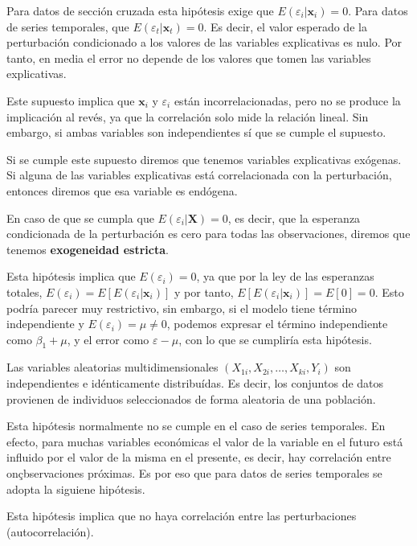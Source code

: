 Para datos de secci\'on cruzada esta hip\'otesis exige que $E(\varepsilon_i|\boldsymbol{x}_i)=0$. Para datos de series temporales, que $E(\varepsilon_t|\boldsymbol{x}_t)=0$. Es decir, el valor esperado de la perturbaci\'on condicionado a los valores de las variables explicativas es nulo. Por tanto, en media el error no depende de los valores que tomen las variables explicativas.

Este supuesto implica que $\boldsymbol{x}_i$ y $\varepsilon_i$ est\'an incorrelacionadas, pero no se produce la implicaci\'on al rev\'es, ya que la correlaci\'on solo mide la relaci\'on lineal. Sin embargo, si ambas variables son independientes s\'i que se cumple el supuesto.

Si se cumple este supuesto diremos que tenemos variables explicativas ex\'ogenas. Si alguna de las variables explicativas est\'a correlacionada con la perturbaci\'on, entonces diremos que esa variable es end\'ogena.

En caso de que se cumpla que $E(\varepsilon_i|\boldsymbol{X})=0$, es decir, que la esperanza condicionada de la perturbaci\'on es cero para todas las observaciones, diremos que tenemos \textbf{exogeneidad estricta}.

Esta hip\'otesis implica que $E(\varepsilon_i)=0$, ya que por la ley de las esperanzas totales, $E(\varepsilon_i)=E[E(\varepsilon_i|\boldsymbol{x}_i)]$ y por tanto, $E[E(\varepsilon_i|\boldsymbol{x}_i)]=E[0]=0$. Esto podr\'ia parecer muy restrictivo, sin embargo, si el modelo tiene t\'ermino independiente y $E(\varepsilon_i)=\mu\neq 0$, podemos expresar el t\'ermino independiente como $\beta_1+\mu$, y el error como $\varepsilon-\mu$, con lo que se cumplir\'ia esta hip\'otesis.

Las variables aleatorias multidimensionales $(X_{1i},X_{2i},\ldots,X_{ki},Y_{i})$ son independientes e id\'enticamente distribu\'idas. Es decir, los conjuntos de datos provienen de individuos seleccionados de forma aleatoria de una poblaci\'on.

Esta hip\'otesis normalmente no se cumple en el caso de series temporales. En efecto, para muchas variables econ\'omicas el valor de la variable en el futuro est\'a influido por el valor de la misma en el presente, es decir, hay correlaci\'on entre onçbservaciones pr\'oximas. Es por eso que para datos de series temporales se adopta la siguiene hip\'otesis.

Esta hip\'otesis implica que no haya correlaci\'on entre las perturbaciones (autocorrelaci\'on).

